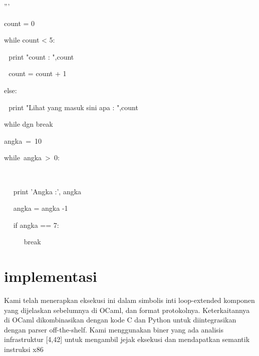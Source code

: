 ''' \par
count = 0 \par
while count < 5: \par
 $  $  $  $  $  $print "count : ",count \par
 $  $  $  $  $  $count = count + 1 \par
else: \par
 $  $  $  $ print "Lihat yang masuk sini apa : ",count \par
\vspace{12pt}
while dgn break \par
angka~=~10~~~~~~    \par
while~angka~>~0:~~~~~~~~~~     \par
~~  \par
~~ print 'Angka :', angka \par
~~ angka = angka -1 \par
~~ if angka == 7: \par
~~~~~ break \par
\vspace{\baselineskip}
\vspace{12pt}
\vspace{12pt}

\section {implementasi}
Kami telah menerapkan eksekusi ini dalam simbolis inti loop-extended komponen yang dijelaskan sebelumnya di OCaml, dan format protokolnya. 
Keterkaitannya di OCaml dikombinasikan dengan kode C dan Python untuk diintegrasikan dengan parser off-the-shelf. 
Kami menggunakan biner yang ada analisis infrastruktur [4,42] untuk mengambil jejak eksekusi dan mendapatkan semantik instruksi x86

